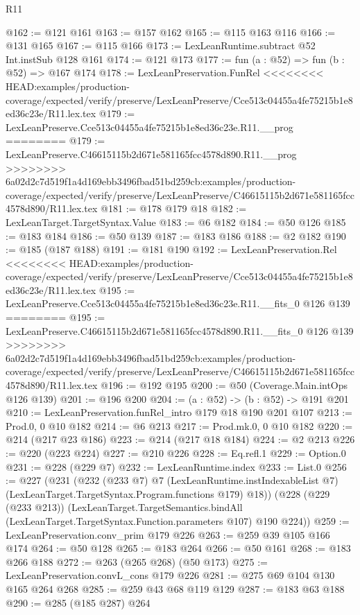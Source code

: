 \begin{lexlean}{R11}
\begin{coremodule}
{{{{{@162 := @121 @161
@163 := @157 @162
@165 := @115 @163 @116
@166 := @131 @165
@167 := @115 @166
@173 := LexLeanRuntime.subtract @52 Int.instSub @128 @161
@174 := @121 @173
@177 := fun (a : @52) => fun (b : @52) => @167 @174
@178 := LexLeanPreservation.FunRel
<<<<<<<< HEAD:examples/production-coverage/expected/verify/preserve/LexLeanPreserve/Cce513c04455a4fe75215b1e8ed36c23e/R11.lex.tex
@179 := LexLeanPreserve.Cce513c04455a4fe75215b1e8ed36c23e.R11.__prog
========
@179 := LexLeanPreserve.C46615115b2d671e581165fcc4578d890.R11.__prog
>>>>>>>> 6a02d2c7d519f1a4d169ebb3496fbad51bd259cb:examples/production-coverage/expected/verify/preserve/LexLeanPreserve/C46615115b2d671e581165fcc4578d890/R11.lex.tex
@181 := @178 @179 @18
@182 := LexLeanTarget.TargetSyntax.Value
@183 := @6 @182
@184 := @50 @126
@185 := @183 @184
@186 := @50 @139
@187 := @183 @186
@188 := @2 @182
@190 := @185 (@187 @188)
@191 := @181 @190
@192 := LexLeanPreservation.Rel
<<<<<<<< HEAD:examples/production-coverage/expected/verify/preserve/LexLeanPreserve/Cce513c04455a4fe75215b1e8ed36c23e/R11.lex.tex
@195 := LexLeanPreserve.Cce513c04455a4fe75215b1e8ed36c23e.R11.__fits_0 @126 @139
========
@195 := LexLeanPreserve.C46615115b2d671e581165fcc4578d890.R11.__fits_0 @126 @139
>>>>>>>> 6a02d2c7d519f1a4d169ebb3496fbad51bd259cb:examples/production-coverage/expected/verify/preserve/LexLeanPreserve/C46615115b2d671e581165fcc4578d890/R11.lex.tex
@196 := @192 @195
@200 := @50 (Coverage.Main.intOps @126 @139)
@201 := @196 @200
@204 := (a : @52) -> (b : @52) -> @191 @201
@210 := LexLeanPreservation.funRel_intro @179 @18 @190 @201 @107
@213 := Prod.{0, 0} @10 @182
@214 := @6 @213
@217 := Prod.mk.{0, 0} @10 @182
@220 := @214 (@217 @23 @186)
@223 := @214 (@217 @18 @184)
@224 := @2 @213
@226 := @220 (@223 @224)
@227 := @210 @226
@228 := Eq.refl.{1}
@229 := Option.{0}
@231 := @228 (@229 @7)
@232 := LexLeanRuntime.index
@233 := List.{0}
@256 := @227
    (@231
      (@232
        (@233 @7)
        @7
        (LexLeanRuntime.instIndexableList @7)
        (LexLeanTarget.TargetSyntax.Program.functions @179)
        @18))
    (@228
      (@229 (@233 @213))
      (LexLeanTarget.TargetSemantics.bindAll
        (LexLeanTarget.TargetSyntax.Function.parameters @107)
        @190
        @224))
@259 := LexLeanPreservation.conv_prim @179 @226
@263 := @259 @39 @105 @166 @174
@264 := @50 @128
@265 := @183 @264
@266 := @50 @161
@268 := @183 @266 @188
@272 := @263 (@265 @268) (@50 @173)
@275 := LexLeanPreservation.convL_cons @179 @226
@281 := @275 @69 @104 @130 @165 @264 @268
@285 := @259 @43 @68 @119 @129
@287 := @183 @63 @188
@290 := @285 (@185 @287) @264
}}}}}
\end{coremodule}
\end{lexlean}
